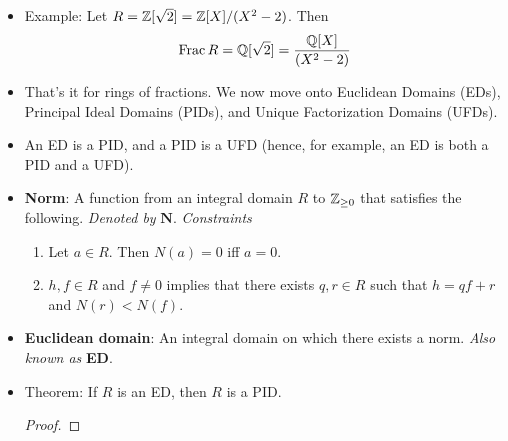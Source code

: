 \documentclass[../notes.tex]{subfiles}
\begin{document}
\begin{itemize}
\begin{proof}
        Background: Consider the injection $R\to F$. It sends every element of $D=R\setminus\{0\}$ to a unit in $F$. Moreover, this function "factors through the fraction field" via Figure \ref{fig:fracDecomp} as per the theorem. We now begin the argument in earnest.\par
        To prove that $K\cong\Frac R$, we will use a bidirectional inclusion proof. For the forward direction, observe that $R\subset\Frac R\subset F$. Therefore, by the definition of $K$, $K\subset\Frac R$, as desired. For the backward direction, let $x/y\in\Frac R$ be arbitrary. To confirm that $x/y\in K$, it will suffice to verify that $x/y\in F'$ for all $R\subset F'\subset F$. Let $F'$ subject to said constraint be arbitrary. Since $x/y\in\Frac R$, $x,y\in R$. It follows since $R\subset F'$ that $x,y\in F'$. Thus, since $F'$ is a field and hence closed under multiplicative inverses, $1/y\in F'$. Finally, since $F'$ is closed under multiplication and $x,1/y\in F'$, we have that $x/y\in F'$, as desired.
    \end{proof}
    \item Example: Let $R=\mathbb{Z}[\sqrt{2}]=\mathbb{Z}[X]/(X^2-2)$. Then
    \begin{equation*}
        \operatorname{Frac} R = \mathbb{Q}[\sqrt{2}] = \frac{\mathbb{Q}[X]}{(X^2-2)}
    \end{equation*}
    \item That's it for rings of fractions. We now move onto Euclidean Domains (EDs), Principal Ideal Domains (PIDs), and Unique Factorization Domains (UFDs).
    \item An ED is a PID, and a PID is a UFD (hence, for example, an ED is both a PID and a UFD).
    \item \textbf{Norm}: A function from an integral domain $R$ to ${\mathbb{Z}_{\geq 0}}$ that satisfies the following. \emph{Denoted by} $\bm{N}$. \emph{Constraints}
    \begin{enumerate}[label={(\roman*)}]
        \item Let $a\in R$. Then $N(a)=0$ iff $a=0$.
        \item $h,f\in R$ and $f\neq 0$ implies that there exists $q,r\in R$ such that $h=qf+r$ and $N(r)<N(f)$.
    \end{enumerate}
    \item \textbf{Euclidean domain}: An integral domain on which there exists a norm. \emph{Also known as} \textbf{ED}.
    \item Theorem: If $R$ is an ED, then $R$ is a PID.
    \begin{proof}



\end{proof}
\end{itemize}
\end{document}
